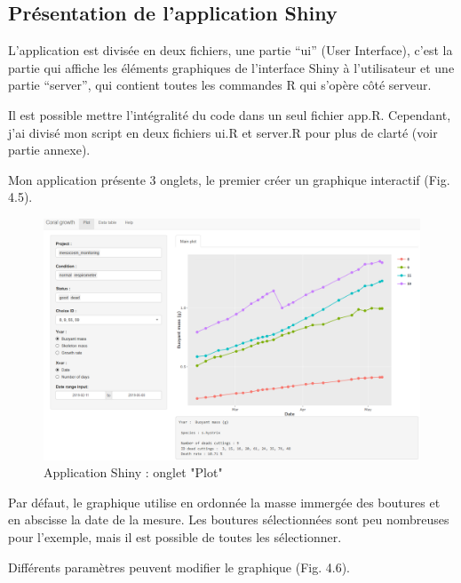 \documentclass[]{article}
\begin{document}
\subsection{Présentation de l'application
Shiny}\label{presentation-de-lapplication-shiny}

L'application est divisée en deux fichiers, une partie ``ui'' (User
Interface), c'est la partie qui affiche les éléments graphiques de
l'interface Shiny à l'utilisateur et une partie ``server'', qui contient
toutes les commandes R qui s'opère côté serveur.

Il est possible mettre l'intégralité du code dans un seul fichier app.R.
Cependant, j'ai divisé mon script en deux fichiers ui.R et server.R pour
plus de clarté (voir partie annexe).

\vspace{1 cm}

Mon application présente 3 onglets, le premier créer un graphique
interactif (Fig. 4.5).

\begin{figure}[h!]
\includegraphics[]{../image/notebook-plot1.PNG}
\caption{Application Shiny : onglet "Plot"}
\end{figure}

\vspace{0.5 cm}

Par défaut, le graphique utilise en ordonnée la masse immergée des
boutures et en abscisse la date de la mesure. Les boutures sélectionnées
sont peu nombreuses pour l'exemple, mais il est possible de toutes les
sélectionner.

\vspace{0.5 cm}

Différents paramètres peuvent modifier le graphique (Fig. 4.6).
\end{document}
